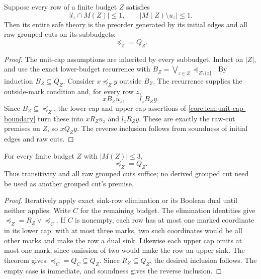 \begin{theorem}
\label{core:thm:unit-cap-raw-completeness}
Suppose every row of a finite budget $Z$ satisfies
\[
 |l_z\cap M(Z)|\leq1,
 \qquad |M(Z)\setminus u_z|\leq1.
\]
Then its entire safe theory is the preorder generated by its initial
edges and all raw grouped cuts on its subbudgets:
\[
 \preceq_Z=Q_Z.
\]
\end{theorem}
\begin{proof}
The unit-cap assumptions are inherited by every subbudget. Induct on
$|Z|$, and use the exact lower-budget recurrence with
$B_Z=\bigvee_{z\in Z}\preceq_{Z\setminus\{z\}}$.
By induction $B_Z\subseteq Q_Z$. Consider
$x\preceq_Zy$ outside $B_Z$. The recurrence supplies the outside-mark
condition and, for every row $z$,
\[
 xB_Zu_z,\qquad l_zB_Zy.
\]
Since $B_Z\subseteq\preceq_Z$, the lower-cap and upper-cap assertions of
\cref{core:lem:unit-cap-boundary} turn these into
$xR_Zu_z$ and $l_zR_Zy$. These are exactly the raw-cut premises on $Z$,
so $xQ_Zy$.
The reverse inclusion follows from soundness of initial edges and raw
cuts.
\end{proof}

\begin{corollary}
\label{core:cor:three-marked-raw-completeness}
For every finite budget $Z$ with $|M(Z)|\leq3$,
\[
 \preceq_Z=Q_Z.
\]
Thus transitivity and all raw grouped cuts suffice; no derived grouped
cut need be used as another grouped cut's premise.
\end{corollary}
\begin{proof}
Iteratively apply exact sink-row elimination or its Boolean dual until
neither applies. Write $C$ for the remaining budget. The elimination
identities give
$\preceq_Z=R_Z\vee\preceq_C$.
If $C$ is nonempty, each row has at most one marked coordinate in its
lower cap: with at most three marks, two such coordinates would be all
other marks and make the row a dual sink. Likewise each upper cap omits
at most one mark, since omission of two would make the row an upper
sink. The theorem gives $\preceq_C=Q_C\subseteq Q_Z$. Since
$R_Z\subseteq Q_Z$, the desired inclusion follows. The empty case is
immediate, and soundness gives the reverse inclusion.
\end{proof}

